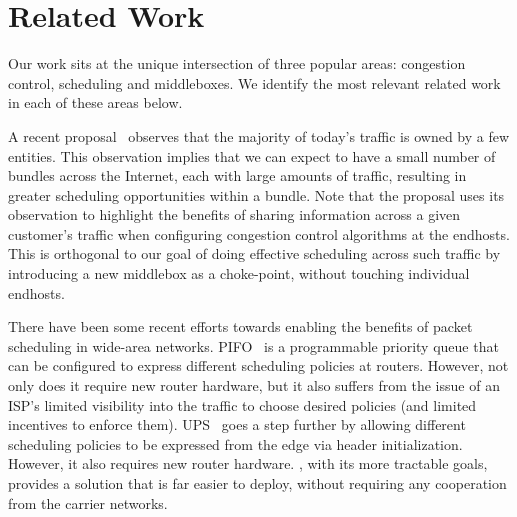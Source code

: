 \section{Related Work}
\label{s:related}

Our work sits at the unique intersection of three popular areas: congestion control, scheduling and middleboxes. We identify the most relevant related work in each of these areas below. 


 A recent proposal~\cite{fivecomps} observes that the majority of today's traffic is owned by a few entities.
This observation implies that we can expect to have a small number of bundles across the Internet, each with large amounts of traffic, resulting in greater scheduling opportunities within a bundle. Note that the proposal uses its observation to highlight the benefits of sharing information across a given customer's traffic when configuring congestion control algorithms at the endhosts. This is orthogonal to our goal of doing effective scheduling across such traffic by introducing a new middlebox as a choke-point, without touching individual endhosts.


 There have been some recent efforts towards enabling the benefits of packet scheduling in wide-area networks. PIFO~\cite{pifo} is a programmable priority queue that can be configured to express different scheduling policies at routers.  However, not only does it require new router hardware, but it also suffers from the issue of an ISP's limited visibility into the traffic to choose desired policies (and limited incentives to enforce them). UPS~\cite{ups} goes a step further by allowing different scheduling policies to be expressed from the edge via header initialization. 
However, it also requires new router hardware. \name, with its more tractable goals, provides a solution that is far easier to deploy, without requiring any cooperation from the carrier networks. 

